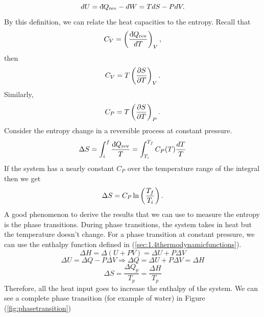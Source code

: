         \begin{equation}
            dU = \text{d}\hspace*{-0.13em}\bar{}\hspace*{0.1em} Q_\text{rev} - dW = TdS - PdV.
        \end{equation}
        By this definition, we can relate the heat capacities to the entropy. Recall that
        \begin{equation}
            C_V = \left( \frac{\text{d}\hspace*{-0.13em}\bar{}\hspace*{0.1em} Q_\text{rev}}{dT} \right)_V,
        \end{equation}
        then
        \begin{equation}
            C_V = T\left( \frac{\partial S}{\partial T} \right)_V.
        \end{equation}
        Similarly,
        \begin{equation}
            C_P = T\left( \frac{\partial S}{\partial T} \right)_P.
        \end{equation}
        Consider the entropy change in a reversible process at constant pressure.
        \begin{equation}
            \Delta S = \int_i^f\frac{\text{d}\hspace*{-0.13em}\bar{}\hspace*{0.1em} Q_\text{rev}}{T} = \int_{T_i}^{T_f}C_P(T)\frac{dT}{T}
        \end{equation}
        If the system has a nearly constant $C_P$ over the temperature range of the integral then we get
        \begin{equation}
            \Delta S = C_P\ln\left( \frac{T_f}{T_i} \right).
        \end{equation}
        A good phenomenon to derive the results that we can use to measure the entropy is the phase transitions. During phase transitions, the system takes in heat but the temperature doesn't change. For a phase transition at constant pressure, we can use the enthalpy function defined in (\ref{sec:1.4thermodynamicfunctions}).
        \begin{equation}
            \Delta H = \Delta(U+PV) = \Delta U + P\Delta V
        \end{equation}
        \begin{equation}
            \Delta U = \Delta Q - P\Delta V \Rightarrow \Delta Q = \Delta U +P\Delta V = \Delta H
        \end{equation}
        \begin{equation}
            \Delta S = \frac{\Delta Q_p}{T_p}=\frac{\Delta H}{T_p}
        \end{equation}
        Therefore, all the heat input goes to increase the enthalpy of the system. We can see a complete phase transition (for example of water) in Figure (\ref{fig:phasetransition})
